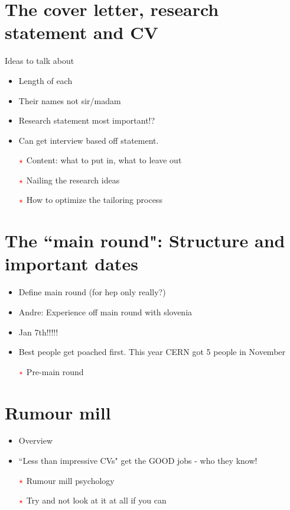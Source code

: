 \documentclass[10pt]{beamer}
\begin{document}
\section{The cover letter, research statement and CV}
\begin{frame}
Ideas to talk about
\begin{itemize}
	\item Length of each
	\item Their names not sir/madam
	\item Research statement most important!?
	\item Can get interview based off statement.
	\item [{$\color{red}\star$}] Content: what to put in, what to leave out
	\item [{$\color{red}\star$}] Nailing the research ideas
	\item [{$\color{red}\star$}] How to optimize the tailoring process
\end{itemize}

\end{frame}
\section{The ``main round": Structure and important dates}
\begin{frame}
	\begin{itemize}
		\item Define main round (for hep only really?)
		\item Andre: Experience off main round with slovenia 
		\item Jan 7th!!!!!
		\item Best people get poached first. This year CERN got 5 people in November
		\item [{$\color{red}\star$}] Pre-main round
	\end{itemize}
\end{frame}


\section{Rumour mill}
\begin{frame}
\begin{itemize}
	\item Overview
		\item ``Less than impressive CVs" get the GOOD jobs  - who they know!
		\item [{$\color{red}\star$}] Rumour mill psychology

		\item [{$\color{red}\star$}] Try and not look at it at all if you can
\end{itemize}
\end{frame}
\end{document}
